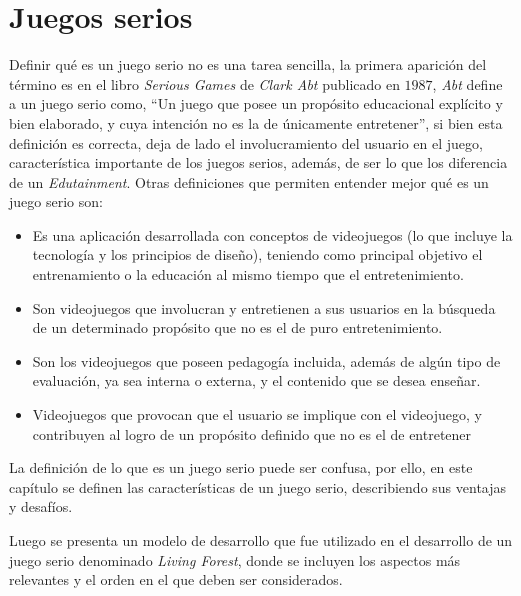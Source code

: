 \chapter{Juegos serios}
\label{chap:juegos_serios}

Definir qué es un juego serio no es una tarea sencilla, la primera aparición del
término es en el libro \emph{Serious Games} de \emph{Clark Abt} publicado en
$1987$\cite{abt1987serious}, \emph{Abt} define a un juego serio como,
\enquote{Un juego que posee un propósito educacional explícito y bien elaborado,
    y cuya intención no es la de únicamente entretener}\cite{abt1987serious}, si
bien esta definición es correcta, deja de lado el involucramiento del usuario en
el juego, característica importante de los juegos serios, además, de ser lo que
los diferencia de un \emph{Edutainment}\cite{resnick:2004,charsky:2010}. Otras
definiciones que permiten entender mejor qué es un juego serio son:

\begin{itemize}
    \item Es una aplicación desarrollada con conceptos de videojuegos (lo que
        incluye la tecnología y los principios de diseño), teniendo como
        principal objetivo el entrenamiento o la educación al mismo tiempo que
        el entretenimiento\cite{ludus:sg}.
    \item Son videojuegos que involucran y entretienen a sus usuarios en la
        búsqueda de un determinado propósito que no es el de puro
        entretenimiento\cite{ludus:sg}.
    \item Son los videojuegos que poseen pedagogía incluida, además de algún tipo de
        evaluación, ya sea interna o externa, y el contenido que se desea
        enseñar\cite{damien:sg,sg:aoverview}.
    \item Videojuegos que provocan que el usuario se implique con el videojuego, y
        contribuyen al logro de un propósito definido que no es el de
        entretener\cite{sg:aoverview}
\end{itemize}

La definición de lo que es un juego serio puede ser confusa, por ello, en este
capítulo se definen las características de un juego serio, describiendo sus
ventajas y desafíos. 

Luego se presenta un modelo de desarrollo que fue utilizado en el desarrollo de
un juego serio denominado \textit{Living Forest}, donde se incluyen los aspectos
más relevantes y el orden en el que deben ser considerados.

